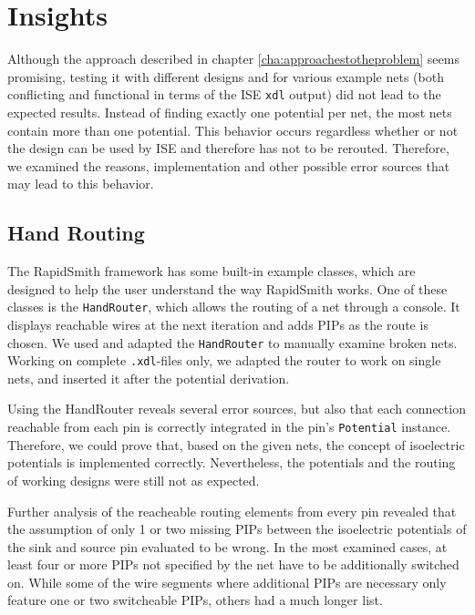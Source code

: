 \chapter{Insights}
\label{cha:insights}

Although the approach described in chapter \ref{cha:approachestotheproblem} seems promising, testing it with different designs and for various example nets (both conflicting and functional in terms of the ISE \texttt{xdl} output) did not lead to the expected results. Instead of finding exactly one potential per net, the most nets contain more than one potential. This behavior occurs regardless whether or not the design can be used by ISE and therefore has not to be rerouted.
Therefore, we examined the reasons, implementation and other possible error sources that may lead to this behavior.

\section{Hand Routing}
\label{sec:handrouting}

The RapidSmith framework has some built-in example classes, which are designed to help the user understand the way RapidSmith works. One of these classes is the \texttt{HandRouter}, which allows the routing of a net through a console. It displays reachable wires at the next iteration and adds PIPs as the route is chosen. We used and adapted the \texttt{HandRouter} to manually examine broken nets. Working on complete \texttt{.xdl}-files only, we adapted the router to work on single nets, and inserted it after the potential derivation.

Using the HandRouter reveals several error sources, but also that each connection reachable from each pin is correctly integrated in the pin's \texttt{Potential} instance. Therefore, we could prove that, based on the given nets, the concept of isoelectric potentials is implemented correctly. Nevertheless, the potentials and the routing of working designs were still not as expected.

Further analysis of the reacheable routing elements from every pin revealed that the assumption of only 1 or two missing PIPs between the isoelectric potentials of the sink and source pin evaluated to be wrong. In the most examined cases, at least four or more PIPs not specified by the net have to be additionally switched on. While some of the wire segments where additional PIPs are necessary only feature one or two switcheable PIPs, others had a much longer list. 

